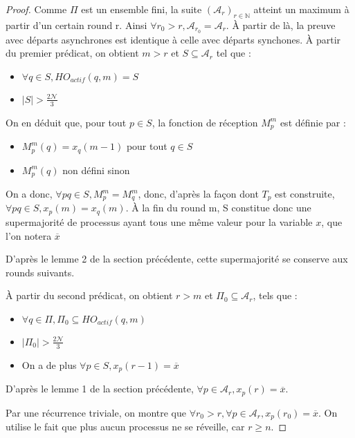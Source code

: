 \documentclass{article}
\begin{document}
\begin{proof}

	Comme $\Pi$ est un ensemble fini, la suite $(\mathcal{A}_r)_{r \in \mathds{N}}$ atteint un maximum à partir d'un certain round r.
	Ainsi $\forall r_0 > r, \mathcal{A}_{r_0} = \mathcal{A}_r$.
	À partir de là, la preuve avec départs asynchrones est identique à celle avec départs synchones. 
	À partir du premier prédicat, on obtient $m > r$ et $S \subseteq \mathcal{A}_r$ tel que :
	\begin{itemize}

		\item $\forall q \in S, HO_{actif}(q, m) = S$
		\item $|S| > \frac{2\mathcal{N}}{3}$

	\end{itemize}

	On en déduit que, pour tout $p \in S$, la fonction de réception $M_p^m$ est définie par :
	\begin{itemize}

		\item $M_p^m(q) = x_q(m-1)$ pour tout $q \in S$
		\item $M_p^m(q)$ non défini sinon

	\end{itemize}

	On a donc, $\forall p q \in S, M_p^m = M_q^m$, donc, d'après la façon dont $T_p$ est construite, $\forall p q \in S, x_p(m) = x_q(m)$.
	À la fin du round m, S constitue donc une supermajorité de processus ayant tous une même valeur pour la variable $x$, que l'on notera $\overline{x}$

D'après le lemme 2 de la section précédente, cette supermajorité se conserve aux rounds suivants.

	À partir du second prédicat, on obtient $r > m$ et $\Pi_0 \subseteq \mathcal{A}_r$, tels que :
	\begin{itemize}

		\item $\forall q \in \Pi, \Pi_0 \subseteq HO_{actif}(q, m)$
		\item $|\Pi_0| > \frac{2\mathcal{N}}{3}$
		\item On a de plus $\forall p \in S, x_p(r-1) = \overline{x}$

	\end{itemize}

	D'après le lemme 1 de la section précédente, $\forall p \in \mathcal{A}_r, x_p(r) = \overline{x}$.

	Par une récurrence triviale, on montre que  $\forall r_0 > r, \forall p \in \mathcal{A}_r, x_p(r_0) = \overline{x}$.
	On utilise le fait que plus aucun processus ne se réveille, car $r \geq n$.



\end{proof}
\end{document}
